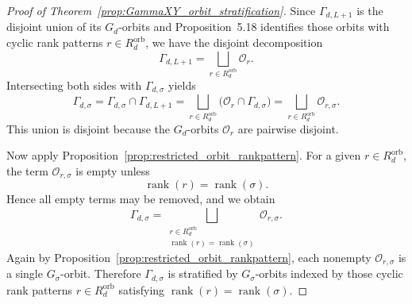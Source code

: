\documentclass{article}
\theoremstyle{definition}
\begin{document}
\begin{proof}[Proof of Theorem~\ref{prop:GammaXY_orbit_stratification}]\label{proof:GammaXY_orbit_stratification}
Since \(\Gamma_{d,L+1}\) is the disjoint union of its \(G_d\)-orbits and Proposition~5.18 identifies
those orbits with cyclic rank patterns \(r\in R_d^{\mathrm{orb}}\), we have the disjoint decomposition
\[
\Gamma_{d,L+1}
=
\bigsqcup_{r\in R_d^{\mathrm{orb}}}\mathcal O_r.
\]
Intersecting both sides with \(\Gamma_{d,\sigma}\) yields
\[
\Gamma_{d,\sigma}
=
\Gamma_{d,\sigma}\cap \Gamma_{d,L+1}
=
\bigsqcup_{r\in R_d^{\mathrm{orb}}}
\bigl(\mathcal O_r\cap \Gamma_{d,\sigma}\bigr)
=
\bigsqcup_{r\in R_d^{\mathrm{orb}}}\mathcal O_{r,\sigma}.
\]
This union is disjoint because the \(G_d\)-orbits \(\mathcal O_r\) are pairwise disjoint.

Now apply Proposition~\ref{prop:restricted_orbit_rankpattern}. For a given \(r\in R_d^{\mathrm{orb}}\),
the term \(\mathcal O_{r,\sigma}\) is empty unless
\[
\operatorname{rank}(r)=\operatorname{rank}(\sigma).
\]
Hence all empty terms may be removed, and we obtain
\[
\Gamma_{d,\sigma}
=
\bigsqcup_{\substack{r\in R_d^{\mathrm{orb}}\\ \operatorname{rank}(r)=\operatorname{rank}(\sigma)}}
\mathcal O_{r,\sigma}.
\]
Again by Proposition~\ref{prop:restricted_orbit_rankpattern}, each nonempty \(\mathcal O_{r,\sigma}\)
is a single \(G_\sigma\)-orbit. Therefore \(\Gamma_{d,\sigma}\) is stratified by \(G_\sigma\)-orbits indexed
by those cyclic rank patterns \(r\in R_d^{\mathrm{orb}}\) satisfying
\(\operatorname{rank}(r)=\operatorname{rank}(\sigma)\).
\end{proof}
\end{document}
